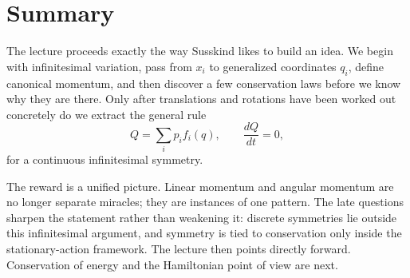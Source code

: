 \section{Summary}

The lecture proceeds exactly the way Susskind likes to build an idea. We begin with infinitesimal variation, pass from \(x_i\) to generalized coordinates \(q_i\), define canonical momentum, and then discover a few conservation laws before we know why they are there. Only after translations and rotations have been worked out concretely do we extract the general rule
\begin{equation}
Q=\sum_i p_i f_i(q),
\qquad
\frac{dQ}{dt}=0,
\end{equation}
for a continuous infinitesimal symmetry.

The reward is a unified picture. Linear momentum and angular momentum are no longer separate miracles; they are instances of one pattern. The late questions sharpen the statement rather than weakening it: discrete symmetries lie outside this infinitesimal argument, and symmetry is tied to conservation only inside the stationary-action framework. The lecture then points directly forward. Conservation of energy and the Hamiltonian point of view are next.